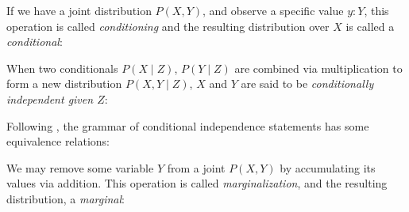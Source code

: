 \documentclass{article}
\begin{document}
If we have a joint distribution $P(X, Y)$, and observe a specific value $y: Y$, this operation is called \textit{conditioning} and the resulting distribution over $X$ is called a \textit{conditional}:


\begin{prooftree}
\end{prooftree}

When two conditionals $P(X \mid Z)$, $P(Y \mid Z)$ are combined via multiplication to form a new distribution $P(X, Y \mid Z)$, $X$ and $Y$ are said to be \textit{conditionally independent given $Z$}:

\begin{prooftree}
\end{prooftree}


%
%

Following \citet{pearl1985graphoids}, the grammar of conditional independence statements has some equivalence relations:



We may remove some variable $Y$ from a joint $P(X, Y)$ by accumulating its values via addition. This operation is called \textit{marginalization}, and the resulting distribution, a \textit{marginal}:
\end{document}
